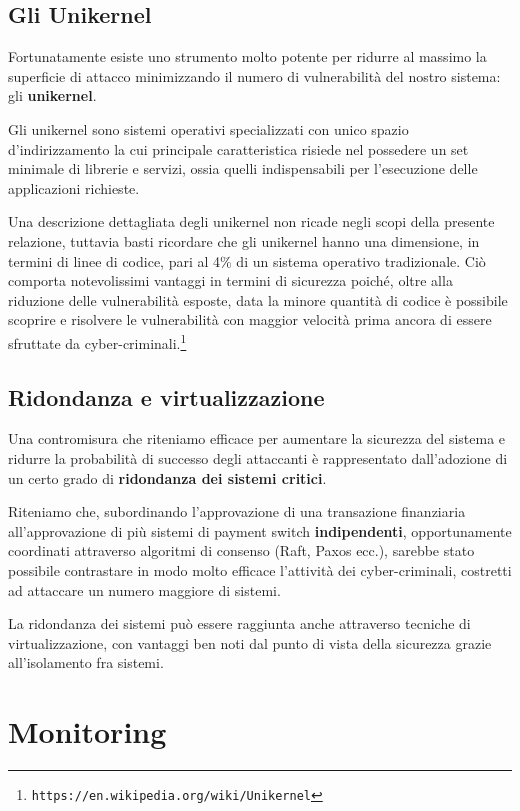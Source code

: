\documentclass[10pt,a4paper, titlepage]{report}
\begin{document}
\subsection{Gli Unikernel}

Fortunatamente esiste uno strumento molto potente per ridurre al massimo la superficie di attacco minimizzando il numero di vulnerabilità del nostro sistema: gli \textbf{unikernel}. 

Gli unikernel sono sistemi operativi specializzati con unico spazio d'indirizzamento la cui principale caratteristica risiede nel possedere un set minimale di librerie e servizi, ossia quelli indispensabili per  l'esecuzione delle applicazioni richieste. 

Una descrizione dettagliata degli unikernel non ricade negli scopi della presente relazione, tuttavia basti ricordare che gli unikernel hanno una dimensione, in termini di linee di codice, pari al 4\% di un sistema operativo tradizionale. Ciò comporta notevolissimi vantaggi in termini di sicurezza poiché, oltre alla riduzione delle vulnerabilità esposte, data la minore quantità di codice è possibile scoprire e risolvere le vulnerabilità 
con maggior velocità prima ancora di essere sfruttate da cyber-criminali.\footnote{\texttt{https://en.wikipedia.org/wiki/Unikernel}}

\subsection{Ridondanza e virtualizzazione}

Una contromisura che riteniamo efficace per aumentare la sicurezza del sistema e ridurre la probabilità di successo degli attaccanti è rappresentato dall'adozione di un certo grado di \textbf{ridondanza dei sistemi critici}.

Riteniamo che, subordinando l'approvazione di una transazione finanziaria all'approvazione di più sistemi di payment switch \textbf{indipendenti}, opportunamente coordinati attraverso algoritmi di consenso (Raft, Paxos ecc.), sarebbe stato possibile contrastare in modo molto efficace l'attività dei cyber-criminali, costretti ad attaccare un numero maggiore di sistemi. 

La ridondanza dei sistemi può essere raggiunta anche attraverso tecniche di virtualizzazione, con vantaggi ben noti dal punto di vista della sicurezza grazie all'isolamento fra sistemi.

\section{Monitoring}
\end{document}
